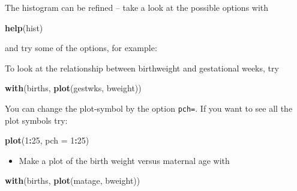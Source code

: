 \documentclass[
]{book}
\newenvironment{Shaded}{\begin{snugshade}}{\end{snugshade}}
\newcommand{\AttributeTok}[1]{\textcolor[rgb]{0.13,0.29,0.53}{#1}}
\newcommand{\DecValTok}[1]{\textcolor[rgb]{0.00,0.00,0.81}{#1}}
\newcommand{\FunctionTok}[1]{\textcolor[rgb]{0.13,0.29,0.53}{\textbf{#1}}}
\newcommand{\NormalTok}[1]{#1}
\newcommand{\SpecialCharTok}[1]{\textcolor[rgb]{0.81,0.36,0.00}{\textbf{#1}}}
\newcommand{\StringTok}[1]{\textcolor[rgb]{0.31,0.60,0.02}{#1}}
\providecommand{\tightlist}{%
  \setlength{\itemsep}{0pt}\setlength{\parskip}{0pt}}
\begin{document}
The histogram can be refined -- take a look at the possible options with

\begin{Shaded}
\begin{Highlighting}[]
\FunctionTok{help}\NormalTok{(hist)}
\end{Highlighting}
\end{Shaded}

and try some of the options, for example:

\begin{Shaded}
\end{Shaded}

To look at the relationship between birthweight and gestational weeks, try

\begin{Shaded}
\begin{Highlighting}[]
\FunctionTok{with}\NormalTok{(births, }\FunctionTok{plot}\NormalTok{(gestwks, bweight))}
\end{Highlighting}
\end{Shaded}

You can change the plot-symbol by the option \texttt{pch=}. If you
want to see all the plot symbols try:

\begin{Shaded}
\begin{Highlighting}[]
\FunctionTok{plot}\NormalTok{(}\DecValTok{1}\SpecialCharTok{:}\DecValTok{25}\NormalTok{, }\AttributeTok{pch =} \DecValTok{1}\SpecialCharTok{:}\DecValTok{25}\NormalTok{)}
\end{Highlighting}
\end{Shaded}

\begin{itemize}
\tightlist
\item
  Make a plot of the birth weight versus maternal age with
\end{itemize}

\begin{Shaded}
\begin{Highlighting}[]
\FunctionTok{with}\NormalTok{(births, }\FunctionTok{plot}\NormalTok{(matage, bweight))}
\end{Highlighting}
\end{Shaded}
\end{document}
